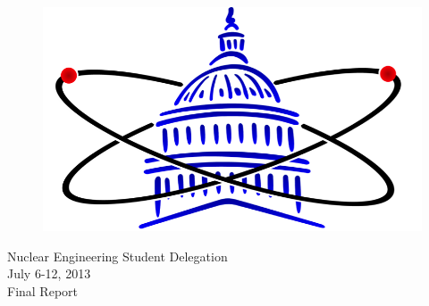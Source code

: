 \begin{center}
\begin{figure}[hbtp]
\centering
\includegraphics*[scale=1]{NESD_Logo.png}
\end{figure}
\begin{LARGE}
Nuclear Engineering Student Delegation\\
July 6-12, 2013\\
Final Report

\vspace{.5cm}
\end{LARGE}
\end{center}
